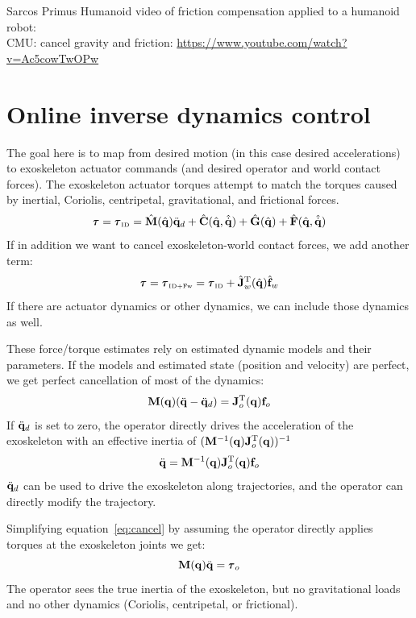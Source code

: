 \documentclass[letterpaper,12pt,fullpage]{article}
\newcommand{\invdyn}{{\mbox {\tiny ID}}}
\newcommand{\invdynw}{{\mbox {\tiny ID+Fw}}}
\begin{document}
Sarcos Primus Humanoid video of friction compensation applied
to a humanoid robot:\\
CMU: cancel gravity and friction: \url{https://www.youtube.com/watch?v=Ac5cowTwOPw}\\

\section{Online inverse dynamics control}
\label{sec:invdyn}

The goal here is to map from desired motion (in this case desired
accelerations) to exoskeleton actuator commands (and desired operator
and world contact forces).
The exoskeleton actuator torques
attempt to match the torques caused by inertial, Coriolis, centripetal,
gravitational, and frictional forces.
\begin{equation}
\vtau = \vtau_{\invdyn} 
= \hat{\mM}(\hat{\vq}) \ddot{\vq}_d
+ \hat{\mC}(\hat{\vq},\hat{\dot{\vq}})
+ \hat{\mG}(\hat{\vq})
+ \hat{\mF}(\hat{\vq},\hat{\dot{\vq}})
\end{equation}
If in addition we want to cancel exoskeleton-world contact forces,
we add another term:
\begin{equation}
\vtau = \vtau_{\invdynw} = \vtau_{\invdyn} 
+ \hat{\mJ}_w^{\tr}(\hat{\vq}) \hat{\vf}_w
\end{equation}
If there are actuator dynamics or other dynamics, we can include those
dynamics as well.

These force/torque estimates rely on estimated dynamic models and their parameters.
If the models and estimated state (position and velocity) are perfect, we get
perfect cancellation of most of the dynamics:
\begin{equation}
{\bf M}({\bf q}) (\ddot{{\bf q}} - \ddot{{\bf q}}_d) = {\bf J}_o^{{\rm T}}({\bf q}) {\bf f}_o
\end{equation}
If $\ddot{{\bf q}}_d$ is set to zero, the operator directly drives the acceleration
of the exoskeleton with an effective inertia of $({\bf M}^{-1}({\bf q}) {\bf J}_o^{{\rm T}}({\bf q}))^{-1}$
\begin{equation}
\ddot{{\bf q}} = {\bf M}^{-1}({\bf q}) {\bf J}_o^{{\rm T}}({\bf q}) {\bf f}_o
\label{eq:cancel}
\end{equation}
$\ddot{{\bf q}}_d$ can be used to drive the exoskeleton along trajectories, and
the operator can directly modify the trajectory.

Simplifying equation~\ref{eq:cancel} by 
assuming the operator directly applies torques at the
exoskeleton joints we get:
\begin{equation}
\mM (\vq) \ddot{\vq} = \vtau_o
\end{equation}
The operator sees the true inertia of the exoskeleton, but no gravitational
loads and no other dynamics (Coriolis, centripetal, or frictional).
\end{document}

